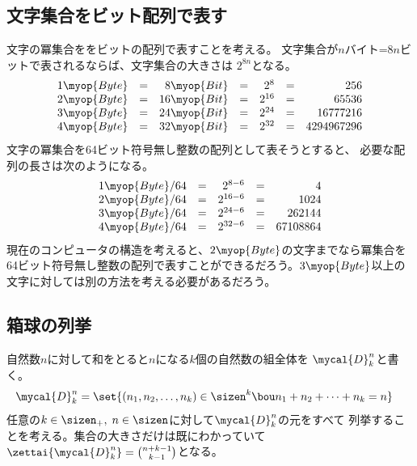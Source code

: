 \subsection{文字集合をビット配列で表す}\label{s2:文字集合をビット配列で表す} %
	文字の冪集合ををビットの配列で表すことを考える。
	文字集合が$n$バイト=$8n$ビットで表されるならば、文字集合の大きさは
	$2^{8n}$となる。
	\begin{equation*}\begin{array}{rcrcrcr} %
		1\myop{Byte} &=& 8\myop{Bit} &=& 2^8 &=& 256 \\
		2\myop{Byte} &=& 16\myop{Bit} &=& 2^{16} &=& 65536 \\
		3\myop{Byte} &=& 24\myop{Bit} &=& 2^{24} &=& 16777216 \\
		4\myop{Byte} &=& 32\myop{Bit} &=& 2^{32} &=& 4294967296 \\
	\end{array}\end{equation*} %
	文字の冪集合を64ビット符号無し整数の配列として表そうとすると、
	必要な配列の長さは次のようになる。
	\begin{equation*}\begin{array}{rcrcrcr} %
		1\myop{Byte}/64 &=& 2^{8-6} &=& 4 \\
		2\myop{Byte}/64 &=& 2^{16-6} &=& 1024 \\
		3\myop{Byte}/64 &=& 2^{24-6} &=& 262144 \\
		4\myop{Byte}/64 &=& 2^{32-6} &=& 67108864 \\
	\end{array}\end{equation*} %
	現在のコンピュータの構造を考えると、$2\myop{Byte}$の文字までなら冪集合を
	64ビット符号無し整数の配列で表すことができるだろう。$3\myop{Byte}$以上の
	文字に対しては別の方法を考える必要があるだろう。
\endgroup %

\begingroup %
	\newcommand{\hakodama}{\mycal{D}}
	\newcommand{\sosei}{\mycal{C}}
	\newcommand{\bunkatu}{\mycal{P}}
	\newcommand{\myeven}{\ensuremath{{2\sizen}}}
	\newcommand{\myodd}{\ensuremath{{2\sizen+1}}}
	\newcommand{\kazu}[1]{\ensuremath{{\sharp_{\myop{#1}}}}}
	\newcommand{\id}{\myop{id}}
	\setlength\arraycolsep{2pt}
\subsection{箱球の列挙}\label{s2:箱球の列挙} %
	自然数$n$に対して和をとると$n$になる$k$個の自然数の組全体を
	$\hakodama_k^n$と書く。
	\begin{equation*}\begin{split} %
		\mycal{D}_k^n &= \set{(n_1,n_2,\dots,n_k)\in\sizen^k
			\bou n_1+n_2+\cdots+n_k=n}
	\end{split}\end{equation*} %
	任意の$k\in\sizen_+,\;n\in\sizen$に対して$\mycal{D}_k^n$の元をすべて
	列挙することを考える。集合の大きさだけは既にわかっていて
	$\zettai{\hakodama_k^n}=\binom{n+k-1}{k-1}$となる。

